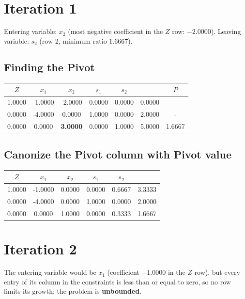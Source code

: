 \section*{Iteration 1}
Entering variable: $x_{2}$ (most negative coefficient in the $Z$ row: $-2.0000$). Leaving variable: $s_{2}$ (row 2, minimum ratio $1.6667$).

\subsection*{Finding the Pivot}
\begin{table}[H]
\centering
\begin{tabular}{|c|c|c|c|c|c|c|}
\hline
\cellcolor{red} $Z$ & \cellcolor{orange} $x_{1}$ & \cellcolor{orange} $x_{2}$ & \cellcolor{yellow} $s_{1}$ & \cellcolor{yellow} $s_{2}$ & \cellcolor{black} \textcolor{white}{$b$} & $P$ \\ 
\hline
1.0000 & -1.0000 & \cellcolor{green!20} -2.0000 & 0.0000 & 0.0000 & 0.0000 & - \\ 
\hline
0.0000 & -4.0000 & \cellcolor{green!20} 0.0000 & 1.0000 & 0.0000 & 2.0000 & - \\ 
\hline
0.0000 & 0.0000 & \cellcolor{green} \textbf{3.0000} & 0.0000 & 1.0000 & 5.0000 & 1.6667 \\ 
\hline
\end{tabular}
\end{table}
\subsection*{Canonize the Pivot column with Pivot value}
\begin{table}[H]
\centering
\begin{tabular}{|c|c|c|c|c|c|}
\hline
\cellcolor{red} $Z$ & \cellcolor{orange} $x_{1}$ & \cellcolor{orange} $x_{2}$ & \cellcolor{yellow} $s_{1}$ & \cellcolor{yellow} $s_{2}$ & \cellcolor{black} \textcolor{white}{$b$} \\ 
\hline
1.0000 & -1.0000 & 0.0000 & 0.0000 & 0.6667 & 3.3333 \\ 
\hline
0.0000 & -4.0000 & 0.0000 & 1.0000 & 0.0000 & 2.0000 \\ 
\hline
0.0000 & 0.0000 & 1.0000 & 0.0000 & 0.3333 & 1.6667 \\ 
\hline
\end{tabular}
\end{table}
\newpage
\section*{Iteration 2}
The entering variable would be $x_{1}$ (coefficient $-1.0000$ in the $Z$ row), but every entry of its column in the constraints is less than or equal to zero, so no row limits its growth: the problem is \textbf{unbounded}.

